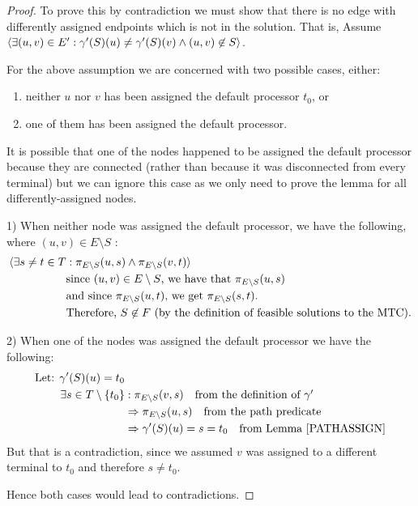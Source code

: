 \begin{proof}
To prove this by contradiction we must show that there is no edge with differently assigned endpoints which is not in the solution.
That is, Assume $\langle \exists (u,v) \in E' : \gamma'(S)(u) \neq \gamma'(S)(v) \wedge (u,v) \not\in S \rangle$.

For the above assumption we are concerned with two possible cases, either:
\begin{enumerate}
	\item neither $u$ nor $v$ has been assigned the default processor $t_0$, or
	\item one of them has been assigned the default processor.
\end{enumerate}

\noindent It is possible that one of the nodes happened to be assigned the default processor because they are connected (rather than because it was disconnected from every terminal) but we can ignore this case as we only need to prove the lemma for all differently-assigned nodes.

1) When neither node was assigned the default processor, we have the following, where $(u, v) \in E \setminus S$ :
\begin{align}
	\nonumber \langle \exists s \neq t \in T  & : \pi_{E \setminus S}(u, s) \wedge \pi_{E \setminus S}(v, t) \rangle \\
	\nonumber & \mbox{since $(u, v) \in E \setminus S$, we have that $\pi_{E \setminus S}(u, s)$} \\
	\nonumber & \mbox{and since $\pi_{E \setminus S}(u, t)$, we get $\pi_{E \setminus S}(s, t)$.} \\
	\nonumber & \mbox{Therefore, $S \not\in F$ (by the definition of feasible solutions to the MTC).}
\end{align}

2) When one of the nodes was assigned the default processor we have the following:
\begin{align}
	\nonumber \mbox{Let: } \gamma'(S)(u) = t_0 & \\
	\nonumber \exists s \in T \setminus \{t_0\} & : \pi_{E \setminus S}(v, s) \quad \mbox{from the definition of $\gamma'$}\\
	\nonumber & \Rightarrow \pi_{E \setminus S}(u, s) \quad \mbox{from the path predicate}\\
	\nonumber & \Rightarrow \gamma'(S)(u) = s = t_0 \quad \mbox{from Lemma \ref{PATHASSIGN}}
\end{align}
But that is a contradiction, since we assumed $v$ was assigned to a different terminal to $t_0$ and therefore $s \neq t_0$.

Hence both cases would lead to contradictions.
\end{proof}

